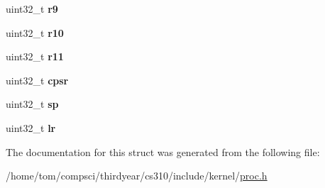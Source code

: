 \begin{DoxyCompactItemize}
uint32\+\_\+t {\bfseries r9}
\item 
\mbox{\label{structproc__state_a3218b6a98e2b774ec5e21182a94df81e}} 
uint32\+\_\+t {\bfseries r10}
\item 
\mbox{\label{structproc__state_ab1967417b0f38edfbc1147e737259123}} 
uint32\+\_\+t {\bfseries r11}
\item 
\mbox{\label{structproc__state_a66c2d07b4fcd564e531af64a51ccdca9}} 
uint32\+\_\+t {\bfseries cpsr}
\item 
\mbox{\label{structproc__state_ae07dfc0243908bc27c73d94316a4ab69}} 
uint32\+\_\+t {\bfseries sp}
\item 
\mbox{\label{structproc__state_a968fef34630a5011721a55d857a5d575}} 
uint32\+\_\+t {\bfseries lr}
\end{DoxyCompactItemize}


The documentation for this struct was generated from the following file\+:\begin{DoxyCompactItemize}
\item 
/home/tom/compsci/thirdyear/cs310/include/kernel/\mbox{\hyperlink{proc_8h}{proc.\+h}}\end{DoxyCompactItemize}
